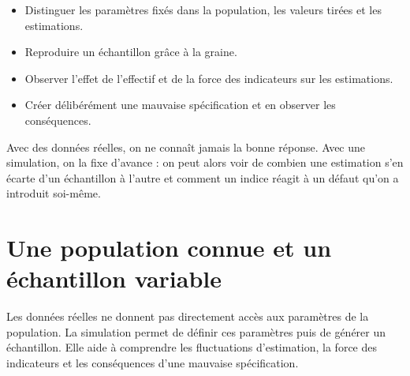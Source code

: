 \documentclass[
  french,
  11pt,
  a4paper,
  DIV=11,
  numbers=noendperiod]{scrreprt}
\providecommand{\tightlist}{%
  \setlength{\itemsep}{0pt}\setlength{\parskip}{0pt}}
\begin{document}
\begin{tcolorbox}[enhanced jigsaw, arc=.35mm, bottomrule=.15mm, bottomtitle=1mm, breakable, colback=white, colbacktitle=quarto-callout-note-color!10!white, colframe=quarto-callout-note-color-frame, coltitle=black, left=2mm, leftrule=.75mm, opacityback=0, opacitybacktitle=0.6, rightrule=.15mm, title={Objectifs du chapitre}, titlerule=0mm, toprule=.15mm, toptitle=1mm]

\begin{itemize}
\tightlist
\item
  Distinguer les paramètres fixés dans la population, les valeurs tirées
  et les estimations.
\item
  Reproduire un échantillon grâce à la graine.
\item
  Observer l'effet de l'effectif et de la force des indicateurs sur les
  estimations.
\item
  Créer délibérément une mauvaise spécification et en observer les
  conséquences.
\end{itemize}

\end{tcolorbox}

\begin{tcolorbox}[enhanced jigsaw, arc=.35mm, bottomrule=.15mm, bottomtitle=1mm, breakable, colback=white, colbacktitle=quarto-callout-tip-color!10!white, colframe=quarto-callout-tip-color-frame, coltitle=black, left=2mm, leftrule=.75mm, opacityback=0, opacitybacktitle=0.6, rightrule=.15mm, title={Idée centrale}, titlerule=0mm, toprule=.15mm, toptitle=1mm]

Avec des données réelles, on ne connaît jamais la bonne réponse. Avec
une simulation, on la fixe d'avance : on peut alors voir de combien une
estimation s'en écarte d'un échantillon à l'autre et comment un indice
réagit à un défaut qu'on a introduit soi-même.

\end{tcolorbox}

\section{Une population connue et un échantillon
variable}\label{une-population-connue-et-un-uxe9chantillon-variable}

Les données réelles ne donnent pas directement accès aux paramètres de
la population. La simulation permet de définir ces paramètres puis de
générer un échantillon. Elle aide à comprendre les fluctuations
d'estimation, la force des indicateurs et les conséquences d'une
mauvaise spécification.
\end{document}
